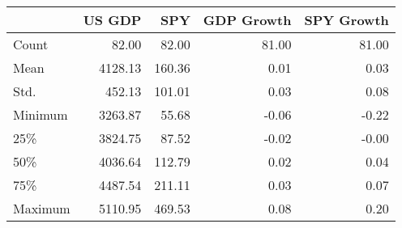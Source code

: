 \begin{tabular}{lrrrr}
\toprule
{} &   US GDP &  SPY  &  GDP Growth &  SPY Growth \\
\midrule
Count &    82.00 &    82.00 &       81.00 &       81.00 \\
Mean  &  4128.13 &   160.36 &        0.01 &        0.03 \\
Std.   &   452.13 &   101.01 &        0.03 &        0.08 \\
Minimum   &  3263.87 &    55.68 &       -0.06 &       -0.22 \\
25\%   &  3824.75 &    87.52 &       -0.02 &       -0.00 \\
50\%   &  4036.64 &   112.79 &        0.02 &        0.04 \\
75\%   &  4487.54 &   211.11 &        0.03 &        0.07 \\
Maximum   &  5110.95 &   469.53 &        0.08 &        0.20 \\
\bottomrule
\end{tabular}
